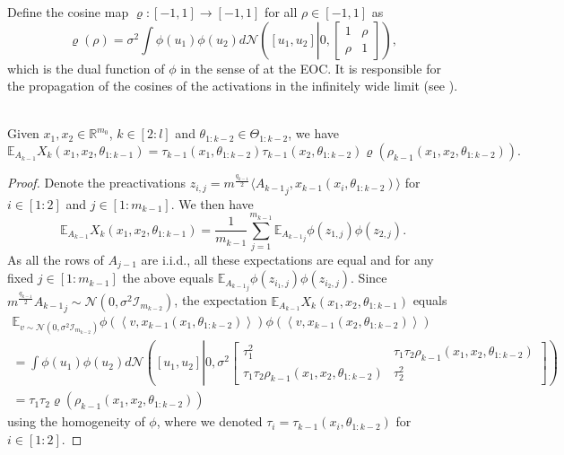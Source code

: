 \documentclass[twoside,11pt]{article}
\newcommand{\R}{\mathbb{R}}
\newcommand{\E}{\mathbb{E}}
\newcommand{\Id}{\mathcal{I}}
\begin{document}
Define the cosine map $\varrho : [-1,1] \to [-1,1]$ for all $\rho \in [-1,1]$ as
\[
\varrho(\rho) 
= \sigma^2 \int \phi(u_1) \phi(u_2) d\mathcal{N}\left( [u_1,u_2] \left\vert 0,\left[ \begin{smallmatrix} 1 & \rho \\ \rho & 1 \end{smallmatrix} \right] \right. \right),
\]
which is the dual function of $\phi$ in the sense of \citet{Danielyetal2016} at the EOC. It is responsible for the propagation of the cosines of the activations in the infinitely wide limit (see \citet[Proposition~9]{mlpsateoc1}).

\begin{proposition}\label{prop:fwd_inner_product_expectation}~\\
Given $x_1,x_2 \in \R^{m_0}$, $k \in [2:l]$ and $\theta_{1:k-2} \in \Theta_{1:k-2}$, we have
\[
\E_{A_{k-1}} X_k(x_1,x_2,\theta_{1:k-1})
= \tau_{k-1}(x_1, \theta_{1:k-2})\tau_{k-1}(x_2, \theta_{1:k-2}) \varrho(\rho_{k-1}(x_1,x_2,\theta_{1:k-2})).
\]
\end{proposition}
\begin{proof}
Denote the preactivations $z_{i,j} = m^{\frac{q_{k-1}}{2}} \langle {A_{k-1}}_j, x_{k-1}(x_i, \theta_{1 : k-2}) \rangle$ for $i \in [1:2]$ and $j \in [1:m_{k-1}]$. We then have
\[
\E_{A_{k-1}} X_k(x_1,x_2,\theta_{1:k-1})
= \frac{1}{m_{k-1}} \sum_{j=1}^{m_{k-1}}\E_{{A_{k-1}}_j} \phi(z_{1,j}) \phi(z_{2,j}).
\]
As all the rows of $A_{j-1}$ are i.i.d., all these expectations are equal and for any fixed $j \in [1:m_{k-1}]$ the above equals $\E_{{A_{k-1}}_j} \phi( z_{i_1,j} ) \phi( z_{i_2,j} )$. Since $m^{\frac{q_{k-1}}{2}}{A_{k-1}}_j \sim \mathcal{N}( 0, \sigma^2 \Id_{m_{k-2}})$, the expectation $\E_{A_{k-1}} X_k(x_1,x_2,\theta_{1:k-1})$ equals
\begin{multline*}
\E_{v \sim \mathcal{N}\left( 0, \sigma^2 \Id_{m_{k-2}} \right)} \phi\left( \left\langle v, x_{k-1}(x_1, \theta_{1 : k-2}) \right\rangle \right) \phi\left( \left\langle v, x_{k-1}(x_2, \theta_{1 : k-2}) \right\rangle \right) \\
= \int \phi(u_1) \phi(u_2) d\mathcal{N}\left([u_1,u_2] \left| 0, \sigma^2 \left[ \begin{smallmatrix} \tau_1^2 & \tau_1 \tau_2 \rho_{k-1}(x_1,x_2,\theta_{1:k-2}) \\ \tau_1 \tau_2 \rho_{k-1}(x_1,x_2,\theta_{1:k-2}) & \tau_2^2 \end{smallmatrix} \right] \right. \right) \\
= \tau_1 \tau_2 \varrho(\rho_{k-1}(x_1,x_2,\theta_{1:k-2}))
\end{multline*}
using the homogeneity of $\phi$, where we denoted $\tau_i = \tau_{k-1}(x_i, \theta_{1:k-2})$ for $i \in [1:2]$.
\end{proof}
\end{document}
